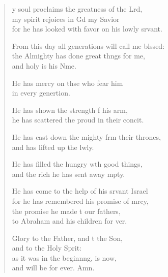 \settowidth{\versewidth}{From this day all generations will call me blessed: +}
\begin{verse}%
  \begin{patverse}
y soul proclaims the greatness of the Lrd,\Flex\\
my spirit rejoices in Gd my Savior\Med\\
for he has looked with favor on his lowly srvant.

From this day all generations will call me blssed:\Flex\\
the Almighty has done great th\pointup{\i}ngs for me,\Med\\
and holy is his Nme.

He has mercy on thse who fear him\Med\\
in every genertion.

He has shown the strength f his arm,\Med\\
he has scattered the proud in their concit.

He has cast down the mighty frm their thrones,\Med\\
and has lifted up the lwly.

He has filled the hungry w\pointup{\i}th good things,\Med\\
and the rich he has sent away mpty.

He has come to the help of his srvant Israel\Med\\
for he has remembered his promise of mrcy,\\
the promise he made t our fathers,\Med\\
to Abraham and his children for ver.

Glory to the Father, and t the Son,\Med\\
and to the Holy Sp\pointup{\i}rit:\\
as it was in the beginn\pointup{\i}ng, is now,\Med\\
and will be for ever. Amn.
  \end{patverse}
\end{verse}
